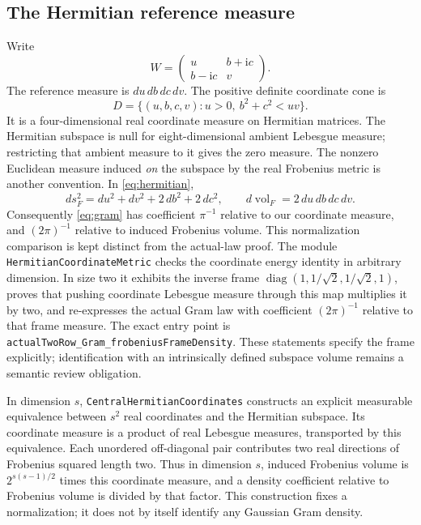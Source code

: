 \documentclass[11pt]{article}
\newcommand{\lean}[1]{{\small\nolinkurl{#1}}}
\begin{document}
\subsection{The Hermitian reference measure}
Write
\begin{equation}\label{eq:hermitian}
 W=\begin{pmatrix}u&b+\mathrm{i}c\\b-\mathrm{i}c&v\end{pmatrix}.
\end{equation}
The reference measure is $du\,db\,dc\,dv$. The positive definite coordinate
cone is
\[
 D=\{(u,b,c,v):u>0,\ b^2+c^2<uv\}.
\]
It is a four-dimensional real coordinate measure on Hermitian matrices.
The Hermitian subspace is null for eight-dimensional ambient Lebesgue measure;
restricting that ambient measure to it gives the zero measure.
The nonzero Euclidean measure induced \emph{on} the subspace by the real
Frobenius metric is another convention. In \eqref{eq:hermitian},
\[
 ds_F^2=du^2+dv^2+2\,db^2+2\,dc^2,\qquad
 d\operatorname{vol}_F=2\,du\,db\,dc\,dv.
\]
Consequently \eqref{eq:gram} has coefficient $\pi^{-1}$ relative to our
coordinate measure, and $(2\pi)^{-1}$ relative to induced Frobenius volume.
This normalization comparison is kept distinct from the actual-law proof.
The module \lean{HermitianCoordinateMetric} checks the coordinate energy
identity in arbitrary dimension. In size two it exhibits the inverse frame
$\operatorname{diag}(1,1/\sqrt2,1/\sqrt2,1)$, proves that pushing coordinate
Lebesgue measure through this map multiplies it by two, and re-expresses the
actual Gram law with coefficient $(2\pi)^{-1}$ relative to that frame measure.
The exact entry point is \lean{actualTwoRow_Gram_frobeniusFrameDensity}.
These statements specify the frame explicitly; identification with an
intrinsically defined subspace volume remains a semantic review obligation.

In dimension $s$, \lean{CentralHermitianCoordinates} constructs an explicit
measurable equivalence between $s^2$ real coordinates and the Hermitian
subspace. Its coordinate measure is a product of real Lebesgue measures,
transported by this equivalence. Each unordered off-diagonal pair contributes
two real directions of Frobenius squared length two. Thus in dimension $s$,
induced Frobenius volume is $2^{s(s-1)/2}$ times this coordinate measure, and
a density coefficient relative to Frobenius volume is divided by that factor.
This construction fixes a normalization;
it does not by itself identify any Gaussian Gram density.
\end{document}
